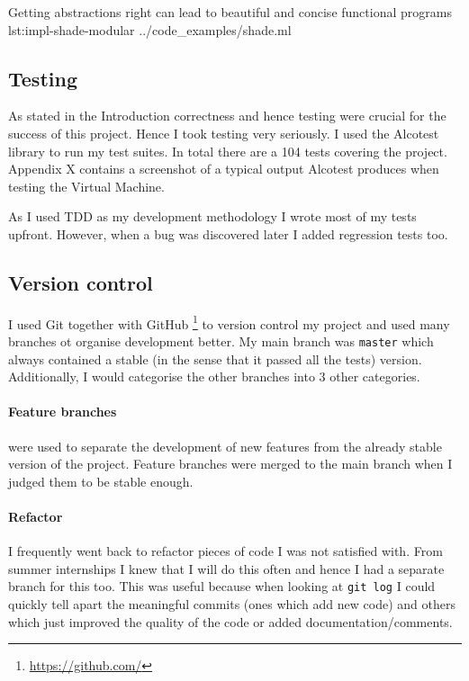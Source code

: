 \documentclass[class=article, crop=false]{standalone}
\begin{document}
{Getting abstractions right can lead to beautiful and concise functional programs}
{lst:impl-shade-modular}
{../code_examples/shade.ml}

\subsection{Testing}

As stated in the Introduction correctness and hence testing were crucial for the success of this project. Hence I took testing very seriously.
I used the Alcotest library to run my test suites. In total there are a 104 tests covering the project. Appendix X contains a screenshot
of a typical output Alcotest produces when testing the Virtual Machine.

As I used TDD as my development methodology I wrote most of my tests upfront. However, when a bug was discovered later I added regression
tests too.

\subsection{Version control}

I used Git together with GitHub
\footnote{\url{https://github.com/}}
to version control my project and used many branches ot organise development better. My main branch was \verb|master| which always contained
a stable (in the sense that it passed all the tests) version. Additionally, I would categorise the other branches into 3 other categories.

\paragraph{Feature branches} were used to separate the development of new features from the already stable version of the project. Feature
branches were merged to the main branch when I judged them to be stable enough.

\paragraph{Refactor} I frequently went back to refactor pieces of code I was not satisfied with. From summer internships
I knew that I will do this often and hence I had a separate branch for this too. This was useful because when looking at
\verb|git log| I could quickly tell apart the meaningful commits (ones which add new code) and others which just improved
the quality of the code or added documentation/comments.
\end{document}
